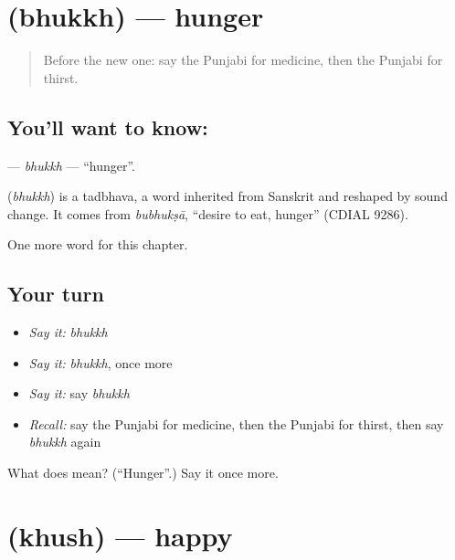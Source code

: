 \section[\texorpdfstring{\pa{ਭੁੱਖ} (bhukkh)}{ਭੁੱਖ (bhukkh)}]{ (bhukkh) — hunger}

\label{lesson:PA-C52-bhukkh}



\begin{quote}
Before the new one: say the Punjabi for medicine, then the Punjabi for thirst.
\end{quote}

\subsection*{You'll want to know: }
\textbf{} — \emph{bhukkh} — \textquotedblleft{}hunger\textquotedblright{}.

\begin{cousinweb}
\textbf{} (\emph{bhukkh}) is a tadbhava, a word inherited from Sanskrit and reshaped by sound change. It comes from \emph{bubhukṣā}, \textquotedblleft{}desire to eat, hunger\textquotedblright{} (CDIAL 9286).
\end{cousinweb}

\begin{grammarlens}[title={What you've built}]
One more word for this chapter.
\end{grammarlens}

\subsection*{Your turn}
\begin{itemize}
\raggedright
  \item \emph{Say it:} \emph{bhukkh}
  \item \emph{Say it:} \emph{bhukkh}, once more
  \item \emph{Say it:} say \emph{bhukkh}
  \item \emph{Recall:} say the Punjabi for medicine, then the Punjabi for thirst, then say \emph{bhukkh} again
\end{itemize}

\begin{tcolorbox}[breakable,colback=teal!4,colframe=teal!35!black,title={Before you move on}]
What does  mean? (\textquotedblleft{}Hunger\textquotedblright{}.) Say it once more.
\end{tcolorbox}
\section[\texorpdfstring{\pa{ਖ਼ੁਸ਼} (khush)}{ਖ਼ੁਸ਼ (khush)}]{ (khush) — happy}

